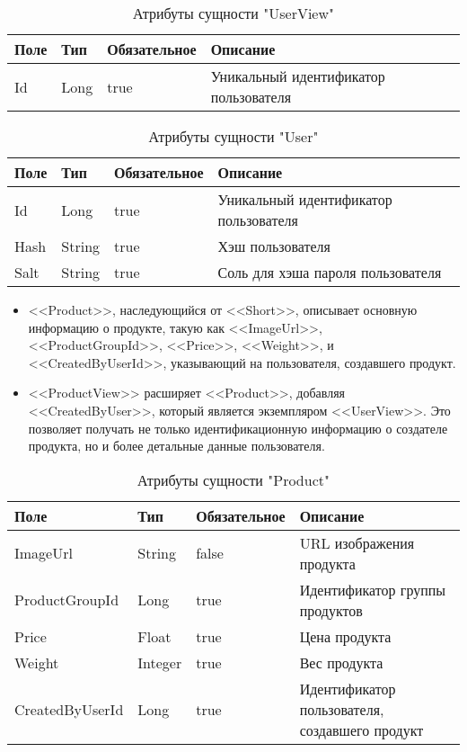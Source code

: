 \begin{xltabular}{\textwidth}{|l|l|p{1.7cm}|X|}
    \caption{Атрибуты сущности "UserView"}\\ \hline
    Поле & Тип & Обяза\-тельное & Описание \\ \hline
    Id & Long & true & Уникальный идентификатор пользователя \\ \hline
\end{xltabular}

\begin{xltabular}{\textwidth}{|l|l|p{1.7cm}|X|}
    \caption{Атрибуты сущности "User"}\\ \hline
    Поле & Тип & Обяза\-тельное & Описание \\ \hline
    Id & Long & true & Уникальный идентификатор пользователя \\ \hline
    Hash & String & true & Хэш пользователя \\ \hline
    Salt & String & true & Соль для хэша пароля пользователя \\ \hline
\end{xltabular}

\begin{itemize}
    \item <<Product>>, наследующийся от <<Short>>, описывает основную информацию о продукте, такую как <<ImageUrl>>, <<ProductGroupId>>, <<Price>>, <<Weight>>, и <<CreatedByUserId>>, указывающий на пользователя, создавшего продукт.
    \item <<ProductView>> расширяет <<Product>>, добавляя <<CreatedByUser>>, который является экземпляром <<UserView>>. Это позволяет получать не только идентификационную информацию о создателе продукта, но и более детальные данные пользователя.
\end{itemize}

\begin{xltabular}{\textwidth}{|l|l|p{1.7cm}|X|}
    \caption{Атрибуты сущности "Product"}\\ \hline
    Поле & Тип & Обяза\-тельное & Описание \\ \hline
    ImageUrl & String & false & URL изображения продукта \\ \hline
    ProductGroupId & Long & true & Идентификатор группы продуктов \\ \hline
    Price & Float & true & Цена продукта \\ \hline
    Weight & Integer & true & Вес продукта \\ \hline
    CreatedByUserId & Long & true & Идентификатор пользователя, создавшего продукт \\ \hline
\end{xltabular}

